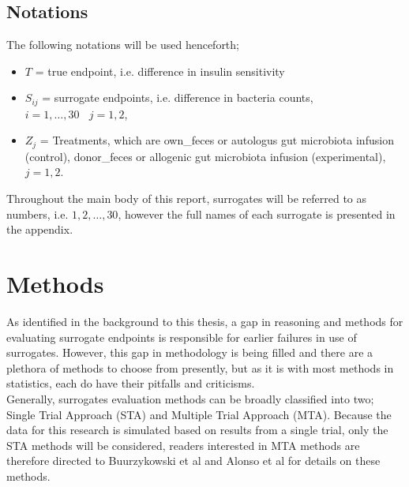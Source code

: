 \documentclass[a4paper,12pt]{article}
\begin{document}
	\subsection{Notations}
	The following notations will be used henceforth;
	\begin{itemize}
		\item $T$ = true endpoint, i.e. difference in insulin sensitivity
		\item $S_{ij}$ = surrogate endpoints, i.e. difference in bacteria counts,  $i=1,\ldots,30 \ \ \ \ j=1,2$, 
		\item $Z_j$ = Treatments, which are own\_feces or autologus gut microbiota infusion (control), donor\_feces or allogenic gut microbiota infusion (experimental), $j=1,2$.
	\end{itemize}
	
	Throughout the main body of this report, surrogates will be referred to as numbers, i.e. $1, 2, \ldots, 30$, however the full names of each surrogate is presented in the appendix.
	
	\section{Methods}
	As identified in the background to this thesis, a gap in reasoning and methods for evaluating surrogate endpoints is responsible for earlier failures in use of surrogates. However, this gap in methodology is being filled and there are a plethora of methods to choose from presently, but as it is with most methods in statistics, each do have their pitfalls and criticisms.\\
	
	Generally, surrogates evaluation methods can be broadly classified into two; Single Trial Approach (STA) and Multiple Trial Approach (MTA). Because the data for this research is simulated based on results from a single trial, only the STA methods will be considered, readers interested in MTA methods are therefore directed to Buurzykowski et al\citep{surrogate2} and Alonso et al\citep{surrogate1} for details on these methods.
	
\end{document}
